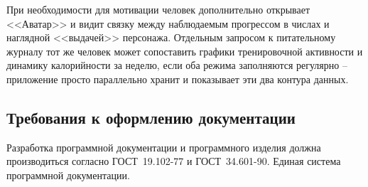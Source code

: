 При необходимости для мотивации человек дополнительно открывает <<Аватар>> и видит связку между наблюдаемым прогрессом в числах и наглядной <<выдачей>> персонажа. Отдельным запросом к питательному журналу тот же человек может сопоставить графики тренировочной активности и динамику калорийности за неделю, если оба режима заполняются регулярно -- приложение просто параллельно хранит и показывает эти два контура данных.

\subsection{Требования к оформлению документации}

Разработка программной документации и программного изделия должна производиться согласно ГОСТ~19.102-77 и ГОСТ~34.601-90. Единая система программной документации.
